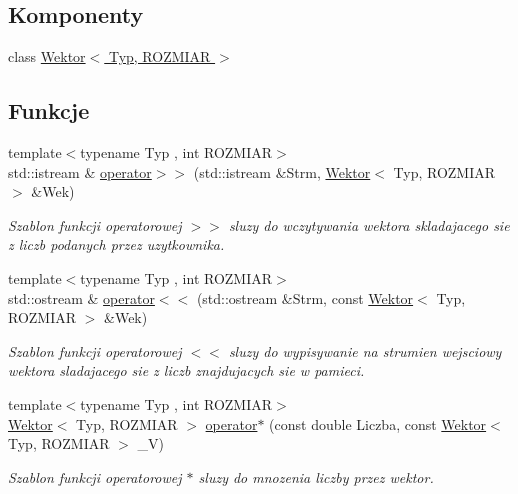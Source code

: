 \subsection*{Komponenty}
\begin{DoxyCompactItemize}
\item 
class \hyperlink{class_wektor}{Wektor$<$ Typ, ROZMIAR $>$}
\end{DoxyCompactItemize}
\subsection*{Funkcje}
\begin{DoxyCompactItemize}
\item 
{\footnotesize template$<$typename Typ , int ROZMIAR$>$ }\\std::istream \& \hyperlink{_wektor_8hh_a819aa25942acc1bc4adcbc6e63081d39}{operator$>$$>$} (std::istream \&Strm, \hyperlink{class_wektor}{Wektor}$<$ Typ, ROZMIAR $>$ \&Wek)
\begin{DoxyCompactList}\small\item\em Szablon funkcji operatorowej $>$$>$ sluzy do wczytywania wektora skladajacego sie z liczb podanych przez uzytkownika. \item\end{DoxyCompactList}\item 
{\footnotesize template$<$typename Typ , int ROZMIAR$>$ }\\std::ostream \& \hyperlink{_wektor_8hh_ad9cda9bedc161ef0997004ec02402850}{operator$<$$<$} (std::ostream \&Strm, const \hyperlink{class_wektor}{Wektor}$<$ Typ, ROZMIAR $>$ \&Wek)
\begin{DoxyCompactList}\small\item\em Szablon funkcji operatorowej $<$$<$ sluzy do wypisywanie na strumien wejsciowy wektora sladajacego sie z liczb znajdujacych sie w pamieci. \item\end{DoxyCompactList}\item 
{\footnotesize template$<$typename Typ , int ROZMIAR$>$ }\\\hyperlink{class_wektor}{Wektor}$<$ Typ, ROZMIAR $>$ \hyperlink{_wektor_8hh_a7c5d0bef7270148f7dcc5629c0728deb}{operator$\ast$} (const double Liczba, const \hyperlink{class_wektor}{Wektor}$<$ Typ, ROZMIAR $>$ \_\-V)
\begin{DoxyCompactList}\small\item\em Szablon funkcji operatorowej $\ast$ sluzy do mnozenia liczby przez wektor. \item\end{DoxyCompactList}\end{DoxyCompactItemize}


